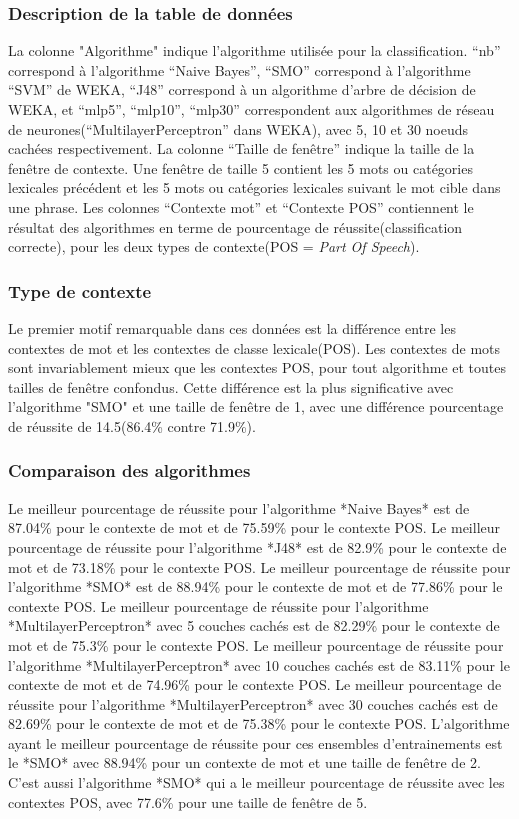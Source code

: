 \documentclass[11pt]{article} %
\begin{document}
\subsubsection{ Description de la table de données }
La colonne "Algorithme" indique l'algorithme utilisée pour la classification.
``nb'' correspond à l'algorithme ``Naive Bayes'', ``SMO'' correspond à l'algorithme ``SVM'' de WEKA, ``J48'' correspond à un algorithme d'arbre de décision de WEKA, et ``mlp5'', ``mlp10'', ``mlp30'' correspondent aux algorithmes de réseau de neurones(``MultilayerPerceptron'' dans WEKA), avec 5, 10 et 30 noeuds cachées respectivement.
La colonne ``Taille de fenêtre'' indique la taille de la fenêtre de contexte.
Une fenêtre de taille 5 contient les 5 mots ou catégories lexicales précédent
et les 5 mots ou catégories lexicales suivant le mot cible dans une phrase.
Les colonnes ``Contexte mot'' et ``Contexte POS'' contiennent le résultat des algorithmes en terme de pourcentage de réussite(classification correcte), pour les deux types de contexte(POS = \emph{Part Of Speech}).

\subsubsection{ Type de contexte }
Le premier motif remarquable dans ces données est la différence entre les contextes de mot et les contextes de classe lexicale(POS).
Les contextes de mots sont invariablement mieux que les contextes POS, pour tout algorithme et toutes tailles de fenêtre confondus.
Cette différence est la plus significative avec l'algorithme "SMO" et une taille de fenêtre de 1, 
avec une différence pourcentage de réussite de 14.5(86.4\% contre 71.9\%).

\subsubsection {Comparaison des algorithmes}

Le meilleur pourcentage de réussite pour l'algorithme *Naive Bayes* est de 87.04\% pour le contexte de mot et de 75.59\% pour le contexte POS.
Le meilleur pourcentage de réussite pour l'algorithme *J48* est de 82.9\% pour le contexte de mot et de 73.18\% pour le contexte POS.
Le meilleur pourcentage de réussite pour l'algorithme *SMO* est de 88.94\% pour le contexte de mot et de 77.86\% pour le contexte POS.
Le meilleur pourcentage de réussite pour l'algorithme *MultilayerPerceptron* avec 5 couches cachés est de 82.29\% pour le contexte de mot et de 75.3\% pour le contexte POS.
Le meilleur pourcentage de réussite pour l'algorithme *MultilayerPerceptron* avec 10 couches cachés est de 83.11\% pour le contexte de mot et de 74.96\% pour le contexte POS.
Le meilleur pourcentage de réussite pour l'algorithme *MultilayerPerceptron* avec 30 couches cachés est de 82.69\% pour le contexte de mot et de 75.38\% pour le contexte POS.
L'algorithme ayant le meilleur pourcentage de réussite pour ces ensembles d'entrainements est le *SMO* avec 88.94\% pour un contexte de mot et une taille de fenêtre de 2.
C'est aussi l'algorithme *SMO* qui a le meilleur pourcentage de réussite avec les contextes POS, avec 77.6\% pour une taille de fenêtre de 5.
\end{document}
